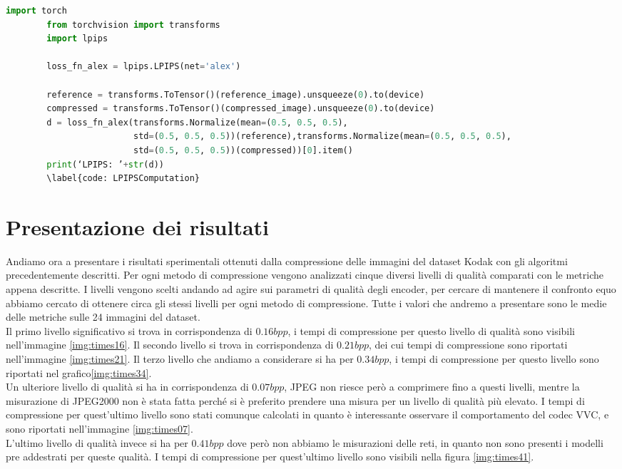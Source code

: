 \begin{adjustbox}{max width=\textwidth}   
    \begin{lstlisting}[language=Python, caption=Spezzone di codice per il calcolo dell'LPIPS con AlexNet, label=code:LPIPSComputation]
        import torch
        from torchvision import transforms
        import lpips
        
        loss_fn_alex = lpips.LPIPS(net='alex')
        
        reference = transforms.ToTensor()(reference_image).unsqueeze(0).to(device)
        compressed = transforms.ToTensor()(compressed_image).unsqueeze(0).to(device)
        d = loss_fn_alex(transforms.Normalize(mean=(0.5, 0.5, 0.5),
                         std=(0.5, 0.5, 0.5))(reference),transforms.Normalize(mean=(0.5, 0.5, 0.5),
                         std=(0.5, 0.5, 0.5))(compressed))[0].item()
        print(‘LPIPS: ’+str(d))
        \label{code: LPIPSComputation}
    \end{lstlisting}
\end{adjustbox} 
    

\section{Presentazione dei risultati}
Andiamo ora a presentare i risultati sperimentali ottenuti dalla compressione delle immagini del dataset Kodak con gli algoritmi precedentemente descritti. Per ogni metodo di compressione vengono analizzati cinque diversi livelli di qualità comparati con le metriche appena descritte. I livelli vengono scelti andando ad agire sui parametri di qualità degli encoder, per cercare di mantenere il confronto equo abbiamo cercato di ottenere circa gli stessi livelli per ogni metodo di compressione. Tutte i valori che andremo a presentare sono le medie delle metriche sulle 24 immagini del dataset.\\
Il primo livello significativo si trova in corrispondenza di $0.16bpp$, i tempi di compressione per questo livello di qualità sono visibili nell’immagine \ref{img:times16}. Il secondo livello si trova in corrispondenza di $0.21bpp$, dei cui tempi di compressione sono riportati nell’immagine \ref{img:times21}. Il terzo livello che andiamo a considerare si ha per $0.34bpp$, i tempi di compressione per questo livello sono riportati nel grafico\ref{img:times34}.\\
Un ulteriore livello di qualità si ha in corrispondenza di $0.07bpp$, JPEG non riesce però a comprimere fino a questi livelli, mentre la misurazione di JPEG2000 non è stata fatta perché si è preferito prendere una misura per un livello di qualità più elevato. I tempi di compressione per quest’ultimo livello sono stati comunque calcolati in quanto è interessante osservare il comportamento del codec VVC, e sono riportati nell’immagine \ref{img:times07}.\\
L’ultimo livello di qualità invece si ha per $0.41bpp$ dove però non abbiamo le misurazioni delle reti, in quanto non sono presenti i modelli pre addestrati per queste qualità. I tempi di compressione per quest’ultimo livello sono visibili nella figura \ref{img:times41}.\\

